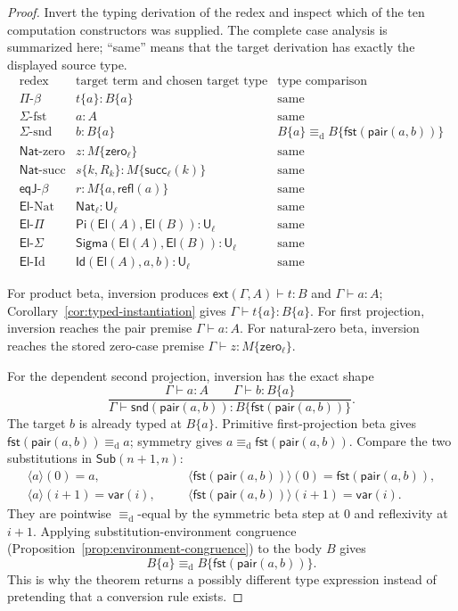 \documentclass[10pt,reqno]{amsart}
\newcommand{\Ext}[2]{\mathsf{ext}(#1,#2)}
\newcommand{\Sub}{\mathsf{Sub}}
\newcommand{\Var}{\mathsf{var}}
\newcommand{\Sort}{\mathsf{U}}
\newcommand{\PiTy}{\mathsf{Pi}}
\newcommand{\SigmaTy}{\mathsf{Sigma}}
\newcommand{\Pair}{\mathsf{pair}}
\newcommand{\Fst}{\mathsf{fst}}
\newcommand{\Snd}{\mathsf{snd}}
\newcommand{\NatTy}{\mathsf{Nat}}
\newcommand{\Zero}{\mathsf{zero}}
\newcommand{\Succ}{\mathsf{succ}}
\newcommand{\El}{\mathsf{El}}
\newcommand{\IdTy}{\mathsf{Id}}
\newcommand{\Refl}{\mathsf{refl}}
\newcommand{\EqJ}{\mathsf{eqJ}}
\newcommand{\defeq}{\mathrel{\equiv_{\mathrm d}}}
\begin{document}
\begin{proof}
Invert the typing derivation of the redex and inspect which of the ten
computation constructors was supplied.
The complete case analysis is summarized here; ``same'' means that the
target derivation has exactly the displayed source type.
\[
\begin{array}{c|c|c}
\text{redex}&\text{target term and chosen target type}&
  \text{type comparison}\\ \hline
\Pi\text{-}\beta&t\{a\}:B\{a\}&\text{same}\\
\Sigma\text{-fst}&a:A&\text{same}\\
\Sigma\text{-snd}&b:B\{a\}&
 B\{a\}\defeq B\{\Fst(\Pair(a,b))\}\\
\NatTy\text{-zero}&z:M\{\Zero_\ell\}&\text{same}\\
\NatTy\text{-succ}&s\{k,R_k\}:M\{\Succ_\ell(k)\}&\text{same}\\
\EqJ\text{-}\beta&r:M\{a,\Refl(a)\}&\text{same}\\
\El\text{-Nat}&\NatTy_\ell:\Sort_\ell&\text{same}\\
\El\text{-}\Pi&\PiTy(\El(A),\El(B)):\Sort_\ell&\text{same}\\
\El\text{-}\Sigma&\SigmaTy(\El(A),\El(B)):\Sort_\ell&\text{same}\\
\El\text{-Id}&\IdTy(\El(A),a,b):\Sort_\ell&\text{same}
\end{array}
\tag{5.9}\label{eq:redex-case-table}
\]

For product beta, inversion produces
\(\Ext{\Gamma}{A}\vdash t:B\) and \(\Gamma\vdash a:A\);
Corollary~\ref{cor:typed-instantiation} gives
\(\Gamma\vdash t\{a\}:B\{a\}\).
For first projection, inversion reaches the pair premise
\(\Gamma\vdash a:A\).  For natural-zero beta, inversion reaches the stored
zero-case premise \(\Gamma\vdash z:M\{\Zero_\ell\}\).

For the dependent second projection, inversion has the exact shape
\[
 \frac{\Gamma\vdash a:A\qquad\Gamma\vdash b:B\{a\}}
      {\Gamma\vdash\Snd(\Pair(a,b)):
         B\{\Fst(\Pair(a,b))\}}.
\]
The target \(b\) is already typed at \(B\{a\}\).  Primitive first-projection
beta gives
\(\Fst(\Pair(a,b))\defeq a\); symmetry gives
\(a\defeq\Fst(\Pair(a,b))\).  Compare the two substitutions in
\(\Sub(n+1,n)\):
\[
\begin{array}{lll}
\langle a\rangle(0)=a,
&\quad&
\langle\Fst(\Pair(a,b))\rangle(0)=\Fst(\Pair(a,b)),\\
\langle a\rangle(i+1)=\Var(i),
&&
\langle\Fst(\Pair(a,b))\rangle(i+1)=\Var(i).
\end{array}
\]
They are pointwise \(\defeq\)-equal by the symmetric beta step at \(0\) and
reflexivity at \(i+1\).  Applying substitution-environment congruence
(Proposition~\ref{prop:environment-congruence}) to the body \(B\) gives
\[
       B\{a\}\defeq B\{\Fst(\Pair(a,b))\}.
\]
This is why the theorem returns a possibly different type expression instead
of pretending that a conversion rule exists.


\end{proof}
\end{document}
